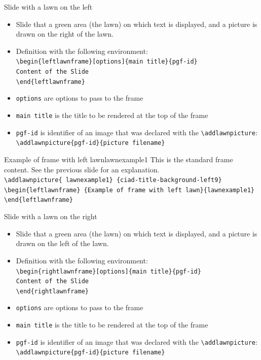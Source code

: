 \documentclass[english,sectioncirclenumberstyle]{ciadbeamer}
\begin{document}
\begin{frame}{Slide with a lawn on the left}
	\begin{itemize}
		\item Slide that a green area (the lawn) on which text is displayed, and a picture is drawn on the right of the lawn.
		\item Definition with the following environment: \\
		\texttt{{\textbackslash}begin\{leftlawnframe\}[options]\{main title\}\{pgf-id\}} \\
		\texttt{Content of the Slide} \\
		\texttt{{\textbackslash}end\{leftlawnframe\}}
		\item \texttt{options} are options to pass to the frame
		\item \texttt{main title} is the title to be rendered at the top of the frame
		\item \texttt{pgf-id} is identifier of an image that was declared with the \texttt{{\textbackslash}addlawnpicture}: \\
		\texttt{{\textbackslash}addlawnpicture\{pgf-id\}\{picture filename\}}
	\end{itemize}
\end{frame}

\begin{leftlawnframe}{{Example of frame} with left lawn}{lawnexample1}
	This is the standard frame content. See the previous slide for an explanation. \\[.5cm]
	\smaller
	\texttt{{\textbackslash}addlawnpicture\{ lawnexample1\} \{ciad-title-background-left9\}} \\
	\texttt{{\textbackslash}begin\{leftlawnframe\} \{Example of frame with left lawn\}\{lawnexample1\}} \\
	\texttt{{\textbackslash}end\{leftlawnframe\}}
\end{leftlawnframe}

\begin{frame}{Slide with a lawn on the right}
	\begin{itemize}
		\item Slide that a green area (the lawn) on which text is displayed, and a picture is drawn on the left of the lawn.
		\item Definition with the following environment: \\
			\texttt{{\textbackslash}begin\{rightlawnframe\}[options]\{main title\}\{pgf-id\}} \\
			\texttt{Content of the Slide} \\
			\texttt{{\textbackslash}end\{rightlawnframe\}}
		\item \texttt{options} are options to pass to the frame
		\item \texttt{main title} is the title to be rendered at the top of the frame
		\item \texttt{pgf-id} is identifier of an image that was declared with the \texttt{{\textbackslash}addlawnpicture}: \\
		\texttt{{\textbackslash}addlawnpicture\{pgf-id\}\{picture filename\}}
	\end{itemize}
\end{frame}
\end{document}
